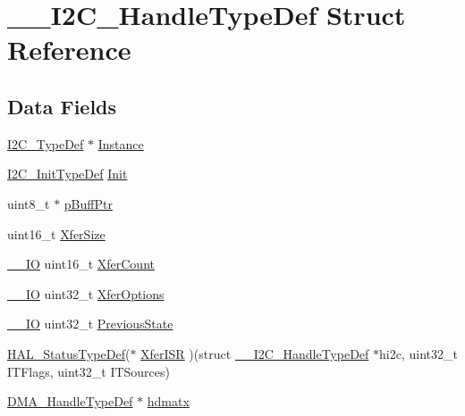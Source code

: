 \hypertarget{struct_____i2_c___handle_type_def}{}\section{\+\_\+\+\_\+\+I2\+C\+\_\+\+Handle\+Type\+Def Struct Reference}
\label{struct_____i2_c___handle_type_def}
\subsection*{Data Fields}
\begin{DoxyCompactItemize}
\item 
\hyperlink{struct_i2_c___type_def}{I2\+C\+\_\+\+Type\+Def} $\ast$ \hyperlink{struct_____i2_c___handle_type_def_a8bdec20782b6b99587806437094c43d2}{Instance}
\item 
\hyperlink{struct_i2_c___init_type_def}{I2\+C\+\_\+\+Init\+Type\+Def} \hyperlink{struct_____i2_c___handle_type_def_a4b1d65e692a280d15470a8184ed2f68a}{Init}
\item 
uint8\+\_\+t $\ast$ \hyperlink{struct_____i2_c___handle_type_def_ae5b117ad14c78eb266b018fb972e315e}{p\+Buff\+Ptr}
\item 
uint16\+\_\+t \hyperlink{struct_____i2_c___handle_type_def_a51999331ab800faccdb97383b39819dd}{Xfer\+Size}
\item 
\hyperlink{core__sc300_8h_aec43007d9998a0a0e01faede4133d6be}{\+\_\+\+\_\+\+IO} uint16\+\_\+t \hyperlink{struct_____i2_c___handle_type_def_a49bf3cd0e9bcb9f41f161663f513f405}{Xfer\+Count}
\item 
\hyperlink{core__sc300_8h_aec43007d9998a0a0e01faede4133d6be}{\+\_\+\+\_\+\+IO} uint32\+\_\+t \hyperlink{struct_____i2_c___handle_type_def_a275aa3c8180a03dbe4bf55fafba3e892}{Xfer\+Options}
\item 
\hyperlink{core__sc300_8h_aec43007d9998a0a0e01faede4133d6be}{\+\_\+\+\_\+\+IO} uint32\+\_\+t \hyperlink{struct_____i2_c___handle_type_def_aa74abfd1a56073ae8c2c826db1be0628}{Previous\+State}
\item 
\hyperlink{stm32f0xx__hal__def_8h_a63c0679d1cb8b8c684fbb0632743478f}{H\+A\+L\+\_\+\+Status\+Type\+Def}($\ast$ \hyperlink{struct_____i2_c___handle_type_def_a5e03f08d05d15496797f071858ebed53}{Xfer\+I\+SR} )(struct \hyperlink{struct_____i2_c___handle_type_def}{\+\_\+\+\_\+\+I2\+C\+\_\+\+Handle\+Type\+Def} $\ast$hi2c, uint32\+\_\+t I\+T\+Flags, uint32\+\_\+t I\+T\+Sources)
\item 
\hyperlink{group___d_m_a___exported___types_ga92b907d56a9c29b93d46782a7a04f91e}{D\+M\+A\+\_\+\+Handle\+Type\+Def} $\ast$ \hyperlink{struct_____i2_c___handle_type_def_a33e13c28b1a70e6164417abb026d7a22}{hdmatx}

\end{DoxyCompactItemize}
